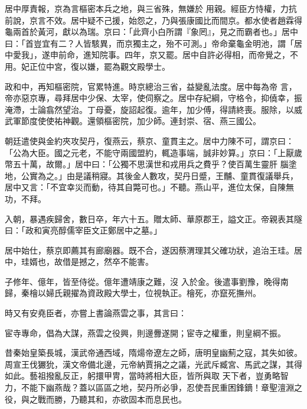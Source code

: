 \begin{pinyinscope}
 居中厚責報，京為言樞密本兵之地，與三省殊，無嫌於
 用親。經臣方恃權，力抗前說，京言不效。居中疑不己援，始怨之，乃與張康國比而間京。都水使者趙霖得龜兩首於黃河，獻以為瑞。京曰：「此齊小白所謂『象罔』，見之而霸者也。」居中曰：「首豈宜有二？人皆駭異，而京獨主之，殆不可測。」帝命棄龜金明池，謂「居中愛我」，遂申前命，進知院事。四年，京又罷。居中自許必得相，而帝覺之，不用。妃正位中宮，復以嫌，罷為觀文殿學士。



 政和中，再知樞密院，官累特進。時京總治三省，益變亂法度。居中每為帝
 言，帝亦惡京專，尋拜居中少保、太宰，使伺察之。居中存紀綱，守格令，抑僥幸，振淹滯，士論翕然望治。丁母憂，旋詔起復。逾年，加少傅，得請終喪。服除，以威武軍節度使使祐神觀。還領樞密院，加少師。連封崇、宿、燕三國公。



 朝廷遣使與金約夾攻契丹，復燕云，蔡京、童貫主之。居中力陳不可，謂京曰：「公為大臣。國之元老，不能守兩國盟約，輒造事端，誠非妙算。」京曰：「上厭歲幣五十萬，故爾。」居中曰：「公獨不思漢世和戎用兵之費乎？使百萬生靈肝
 腦塗地，公實為之。」由是議稍寢。其後金人數攻，契丹日蹙，王黼、童貫復議舉兵，居中又言：「不宜幸災而動，待其自斃可也。」不聽。燕山平，進位太保，自陳無功，不拜。



 入朝，暴遇疾歸舍，數日卒，年六十五。贈太師、華原郡王，謚文正。帝親表其隧曰：「政和寅亮醇儒宰臣文正鄭居中之墓。」



 居中始仕，蔡京即薦其有廊廟器。既不合，遂因蔡渭理其父確功狀，追治王珪。居中，珪婿也，故借是撼之，然卒不能害。



 子修年、億年，皆至侍從。億年遭靖康之難，沒
 入於金。後遣事劉豫，晚得南歸，秦檜以婦氏親擢為資政殿大學士，位視執正。檜死，亦竄死撫州。



 時又有安堯臣者，亦嘗上書論燕雲之事，其言曰：



 宦寺專命，倡為大謀，燕雲之役興，則邊釁遂開；宦寺之權重，則皇綱不振。



 昔秦始皇築長城，漢武帝通西域，隋煬帝遼左之師，唐明皇幽薊之寇，其失如彼。周宣王伐玁狁，漢文帝備北邊，元帝納賈捐之之議，光武斥臧宮、馬武之謀，其得如此。藝祖撥亂反正，躬擐甲冑，當時將相大臣，皆所與取
 天下者，豈勇略智力，不能下幽燕哉？蓋以區區之地，契丹所必爭，忍使吾民重困鋒鏑！章聖澶淵之役，與之戰而勝，乃聽其和，亦欲固本而息民也。




\end{pinyinscope}
